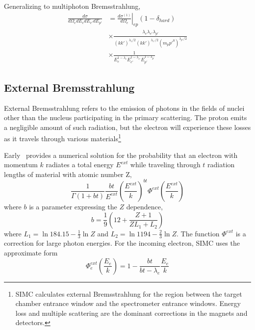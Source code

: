Generalizing to multiphoton Bremsstrahlung,
\begin{align}
    \frac{d\sigma}{d\Omega_e dE_e dE_{e'} dE_{p'}} &= \left. \frac{d\sigma^{(1)}}{d\Omega_e}\right|_{ep} \left(1-\delta_{hard}\right) \\
    &\times\frac{\lambda_e \lambda_{e'} \lambda_{p'}} {\left(kk'\right)^{\lambda_e/2} \left(kk'\right)^{\lambda_{e'}/2} \left(m_p p'^0\right)^{\lambda_{p'}/2}} \\
    &\times\frac{1}{E_{e}^{1-\lambda_{e}} E_{e'}^{1-\lambda_{e'}} E_{p'}^{1-\lambda_{p'}}}
\end{align}

\subsection{External Bremsstrahlung}
External Bremsstrahlung refers to the emission of photons in the fields of
nuclei other than the nucleus participating in the primary scattering.
The proton emits a negligible amount of such radiation, but the electron will
experience these losses as it travels through various materials\footnote{
SIMC calculates external Bremsstrahlung for the region between the target
chamber entrance window and the spectrometer entrance windows.
Energy loss and multiple scattering are the dominant corrections in the magnets
and detectors.}

Early~\cite{Early_1973} provides a numerical solution for the probability that
an electron with momentum $k$ radiates a total energy $E^{ext}$ while traveling
through $t$ radiation lengths of material with atomic number Z,
\begin{equation}
    \frac{1}{\Gamma(1+bt)}
    \frac{bt}{E^{ext}}
    \left(\frac{E^{ext}}{k}\right)^{bt}
    \Phi^{ext}\left(\frac{E^{ext}}{k}\right)
\end{equation}
where $b$ is a parameter expressing the $Z$ dependence,
\begin{equation}
    b = \frac{1}{9}\left(12 + \frac{Z+1}{ZL_1+L_2}\right)
\end{equation}
where
$L_1 = \ln{184.15} - \frac{1}{3} \ln Z$
and
$L_2 = \ln{1194} - \frac{2}{3} \ln Z$.
The function $\Phi^{ext}$ is a correction for large photon energies.
For the incoming electron, SIMC uses the approximate form
\begin{equation}
    \Phi^{ext}_e\left(\frac{E_e}{k}\right) = 1 - \frac{bt}{bt-\lambda_e}\frac{E_e}{k}
\end{equation}


